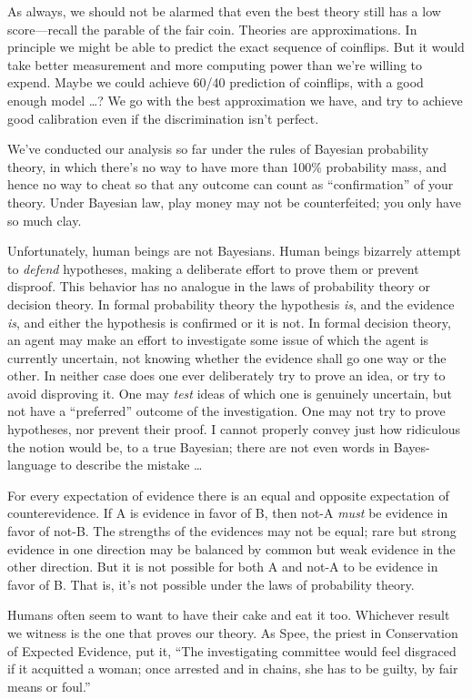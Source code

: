 {
 As always, we should not be alarmed that even the best theory
still has a low score---recall the parable of the fair coin. Theories
are approximations. In principle we might be able to predict the exact
sequence of coinflips. But it would take better measurement and more
computing power than we're willing to expend. Maybe we
could achieve 60/40 prediction of coinflips, with a good enough model
\ldots ? We go with the best approximation we have, and try to achieve
good calibration even if the discrimination isn't
perfect.}

{
 We've conducted our analysis so far under the
rules of Bayesian probability theory, in which there's
no way to have more than 100\% probability mass, and hence no way to
cheat so that any outcome can count as
``confirmation'' of your theory.
Under Bayesian law, play money may not be counterfeited; you only have
so much clay.}

{
 Unfortunately, human beings are not Bayesians. Human beings
bizarrely attempt to \textit{defend} hypotheses, making a deliberate
effort to prove them or prevent disproof. This behavior has no analogue
in the laws of probability theory or decision theory. In formal
probability theory the hypothesis \textit{is}, and the evidence
\textit{is}, and either the hypothesis is confirmed or it is not. In
formal decision theory, an agent may make an effort to investigate some
issue of which the agent is currently uncertain, not knowing whether
the evidence shall go one way or the other. In neither case does one
ever deliberately try to prove an idea, or try to avoid disproving it.
One may \textit{test} ideas of which one is genuinely uncertain, but
not have a ``preferred'' outcome of
the investigation. One may not try to prove hypotheses, nor prevent
their proof. I cannot properly convey just how ridiculous the notion
would be, to a true Bayesian; there are not even words in
Bayes-language to describe the mistake \ldots}

{
 For every expectation of evidence there is an equal and opposite
expectation of counterevidence. If A is evidence in favor of B, then
not-A \textit{must} be evidence in favor of not-B. The strengths of the
evidences may not be equal; rare but strong evidence in one direction
may be balanced by common but weak evidence in the other direction. But
it is not possible for both A and not-A to be evidence in favor of B.
That is, it's not possible under the laws of
probability theory.}

{
 Humans often seem to want to have their cake and eat it too.
Whichever result we witness is the one that proves our theory. As Spee,
the priest in Conservation of Expected Evidence, put it,
``The investigating committee would feel disgraced if
it acquitted a woman; once arrested and in chains, she has to be
guilty, by fair means or foul.''}

